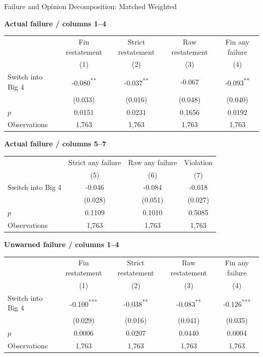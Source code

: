 \documentclass[10pt]{article}
\newcommand{\sym}[1]{\textsuperscript{#1}}
\begin{document}
\fontsize{10}{12}\selectfont
\setlength{\tabcolsep}{3pt}\renewcommand{\arraystretch}{1.15}
\begin{center}\large Failure and Opinion Decomposition: Matched Weighted\end{center}
\medskip\textbf{Actual failure / columns 1--4}\par\smallskip
\begin{tabular*}{\textwidth}{@{\extracolsep{\fill}}lcccc@{}}
\toprule
 & Fin restatement & Strict restatement & Raw restatement & Fin any failure \\
 & (1) & (2) & (3) & (4) \\
\midrule
Switch into Big 4 & -0.080\sym{**} & -0.037\sym{**} & -0.067 & -0.093\sym{**} \\
 & (0.033) & (0.016) & (0.048) & (0.040) \\
$p$ & 0.0151 & 0.0231 & 0.1656 & 0.0192 \\
Observations & 1,763 & 1,763 & 1,763 & 1,763 \\
\bottomrule\end{tabular*}\par
\medskip\textbf{Actual failure / columns 5--7}\par\smallskip
\begin{tabular*}{\textwidth}{@{\extracolsep{\fill}}lccc@{}}
\toprule
 & Strict any failure & Raw any failure & Violation \\
 & (5) & (6) & (7) \\
\midrule
Switch into Big 4 & -0.046 & -0.084 & -0.018 \\
 & (0.028) & (0.051) & (0.027) \\
$p$ & 0.1109 & 0.1010 & 0.5085 \\
Observations & 1,763 & 1,763 & 1,763 \\
\bottomrule\end{tabular*}\par
\medskip\textbf{Unwarned failure / columns 1--4}\par\smallskip
\begin{tabular*}{\textwidth}{@{\extracolsep{\fill}}lcccc@{}}
\toprule
 & Fin restatement & Strict restatement & Raw restatement & Fin any failure \\
 & (1) & (2) & (3) & (4) \\
\midrule
Switch into Big 4 & -0.100\sym{***} & -0.038\sym{**} & -0.083\sym{**} & -0.126\sym{***} \\
 & (0.029) & (0.016) & (0.041) & (0.035) \\
$p$ & 0.0006 & 0.0207 & 0.0440 & 0.0004 \\
Observations & 1,763 & 1,763 & 1,763 & 1,763 \\
\bottomrule\end{tabular*}\par
\end{document}
